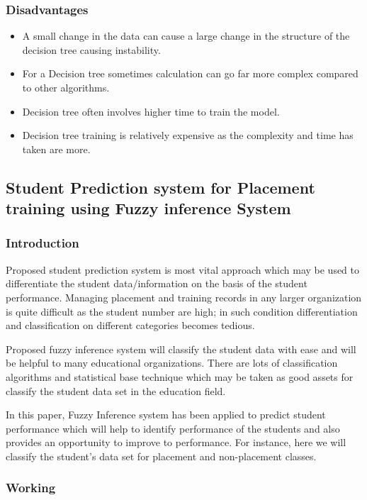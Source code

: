 \documentclass[12pt]{article}
\begin{document}
\subsubsection{Disadvantages}
\begin{itemize}
\item A small change in the data can cause a large change in the structure of the decision tree causing instability.
\item For a Decision tree sometimes calculation can go far more complex compared to other algorithms.
\item Decision tree often involves higher time to train the model.
\item Decision tree training is relatively expensive as the complexity and time has taken are more.
\end{itemize}
\newpage
\subsection{Student Prediction system for Placement training using Fuzzy inference System}
\vspace*{10px}
\subsubsection{Introduction}

Proposed student prediction system is most vital approach which may 
be used to differentiate the student data/information on the basis of the 
student performance. Managing placement and training records in 
any larger organization is quite difficult as the student number are 
high; in such condition differentiation and classification on different 
categories becomes tedious. 

Proposed fuzzy inference system will classify the student data with ease and will be helpful to many 
educational organizations. There are lots of classification algorithms 
and statistical base technique which may be taken as good assets for 
classify the student data set in the education field. 

In this paper, Fuzzy Inference system has been applied to predict student performance 
which will help to identify performance of the students and also 
provides an opportunity to improve to performance. For instance, here 
we will classify the student’s data set for placement and non-placement 
classes.
\newpage
\subsubsection{Working}
\end{document}
